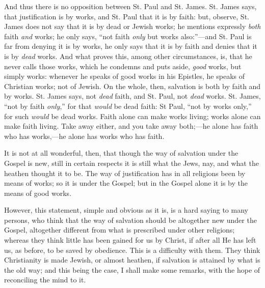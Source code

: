 And thus there is no opposition between St. Paul and St. James. St.
James says, that justification is by works, and St. Paul that it is by
faith: but, observe, St. James does not say that it is by dead or
Jewish works; he mentions expressly \emph{both} faith \emph{and}
works; he only says, ``not faith \emph{only} but works also:''—and
St. Paul is far from denying it is by works, he only says that it is
by faith and denies that it is by \emph{dead} works. And what proves
this, among other circumstances, is, that he never calls those works,
which he condemns and puts aside, \emph{good} works, but simply works:
whenever he speaks of good works in his Epistles, he speaks of
Christian works; not of Jewish. On the whole, then, salvation is both
by faith and by works. St. James says, not \emph{dead} faith, and St.
Paul, not \emph{dead} works. St. James, ``not by faith \emph{only},''
for that \emph{would} be dead faith: St Paul, ``not by works
only,'' for such \emph{would} be dead works. Faith alone can make
works living; works alone can make faith living. Take away either, and
you take away both;—he alone has faith who has works,—he alone has
works who has faith.

It is not at all wonderful, then, that though the way of salvation
under the Gospel is new, still in certain respects it is still what
the Jews, nay, and what the heathen thought it to be. The way of
justification has in all religions been by means of works; so it is
under the Gospel; but in the Gospel alone it is by the means of good
works.

However, this statement, simple and obvious as it is, is a hard
saying to many persons, who think that the way of salvation should be
altogether new under the Gospel, altogether different from what is
prescribed under other religions; whereas they think little has been
gained for us by Christ, if after all He has left us, as before, to be
saved by obedience. This is a difficulty with them. They think
Christianity is made Jewish, or almost heathen, if salvation is
attained by what is the old way; and this being the case, I shall make
some remarks, with the hope of reconciling the mind to it.

